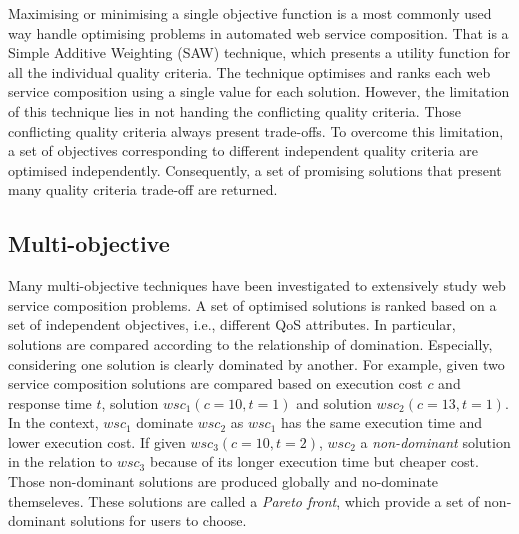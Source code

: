 Maximising or minimising a single objective function is a most commonly used way handle optimising problems in automated web service composition.  That is a Simple Additive Weighting (SAW) \cite{hwang1981lecture} technique, which presents a utility function for all the individual quality criteria. The technique optimises and ranks each web service composition using a single value for each solution. However,  the limitation of this technique lies in not handing the conflicting quality criteria.  Those conflicting quality criteria always present trade-offs. To overcome this limitation, a set of objectives corresponding to different independent quality criteria are optimised independently. Consequently,  a set of promising solutions that present many quality criteria trade-off are returned.


\subsection{Multi-objective}\label{MultiObjective}

Many multi-objective techniques \cite{liu2005dynamic,zhang2010qos,yu2013efficient,yin2014hybrid,xiang2014qos,chen2014partial} have been investigated to extensively study web service composition problems.  A set of optimised solutions is ranked based on a set of independent objectives, i.e., different QoS attributes. In particular, solutions are compared according to the relationship of domination. Especially, considering one solution is clearly dominated by another.  For example, given two service composition solutions are compared based on execution cost $c$ and response time $t$, solution $wsc_1(c=10,t=1)$ and solution $wsc_2(c=13,t=1)$. In the context, $wsc_1$ dominate $wsc_2$ as $wsc_1$ has the same execution time and lower execution cost. If given $wsc_3(c=10,t=2)$, $wsc_2$ a \textit{non-dominant} solution in the relation to $wsc_3$ because of its longer execution time but cheaper cost. Those non-dominant solutions are produced globally and  no-dominate themseleves. These solutions are called a \textit{Pareto front}, which provide a set of non-dominant solutions for users to choose.


